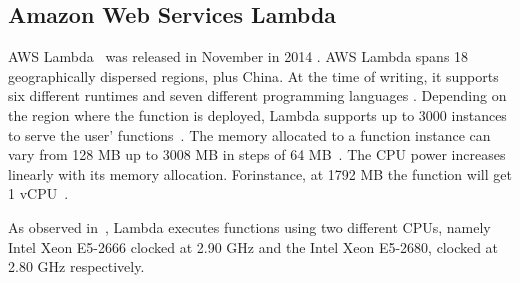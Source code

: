
\subsection{Amazon Web Services Lambda}\label{sec:ss:aws}

\gls{AWS} Lambda~\cite{AWSLambda} was released in November in 2014 \cite{AWSLambdaRelease}. 
\gls{AWS} Lambda spans 18 geographically dispersed regions, plus China\cite{AWSRegions}. 
At the time of writing, it supports six different runtimes and seven different programming languages \cite{AWSLambdaLanguages}. 
Depending on the region where the function is deployed, Lambda supports up to 3000 instances to serve the user' functions~\cite{AWSLambdaScaling}. 
The memory allocated to a function instance can vary from 128 \gls{MB} up to 3008 \gls{MB} in steps of 64 \gls{MB}~\cite{AWSLambdaConfig}. 
The \gls{CPU} power increases linearly with its memory allocation.
Forinstance, at 1792 \gls{MB} the function will get 1 \gls{vCPU}~\cite{AWSLambdaConfig}.

As observed in~\cite{216063}, Lambda executes functions using two different \gls{CPU}s, namely Intel Xeon E5-2666 clocked at 2.90 \gls{GHz}  and the Intel Xeon E5-2680, clocked at 2.80 \gls{GHz} respectively. 

